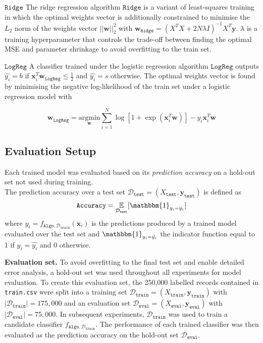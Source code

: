 \documentclass[10pt,conference,compsocconf]{IEEEtran}
\newcommand{\parabf}[1]{\vspace{1mm}\noindent\textbf{#1}}
\newcommand{\Deval}{\mathcal{D}_{\mathtt{eval}}}
\newcommand{\Dtrain}{\mathcal{D}_{\mathtt{train}}}
\newcommand{\Dtest}{\mathcal{D}_{\mathtt{test}}}
\newcommand{\Xtrain}{X_{\mathtt{train}}}
\newcommand{\ytrain}{\mathbf{y}_{\mathtt{train}}}
\newcommand{\Xeval}{X_{\mathtt{eval}}}
\newcommand{\yeval}{\mathbf{y}_{\mathtt{eval}}}
\newcommand{\Xtest}{X_{\mathtt{test}}}
\newcommand{\ytest}{\mathbf{y}_{\mathtt{test}}}
\newcommand{\features}{\mathbf{x}_i}
\newcommand{\target}{y_i}
\newcommand{\targetvector}{\mathbf{y}}
\newcommand{\weights}{\mathbf{w}}
\newcommand{\classifier}[2]{f_{#1, #2}}
\newcommand{\Train}{\mathtt{Algo}}
\newcommand{\Ridge}{\mathtt{Ridge}}
\newcommand{\LogReg}{\mathtt{LogReg}}
\begin{document}
\parabf{$\Ridge$} The ridge regression algorithm $\Ridge$ is a variant of least-squares training in which the optimal weights vector is additionally constrained to minimise the $L_2$ norm of the weights vector $||\weights||_2^2$ with $\weights_\Ridge = (X^T X + 2N\lambda I)^{-1}X^T \targetvector$. $\lambda$ is a training hyperparameter that controls the trade-off between finding the optimal MSE and parameter shrinkage to avoid overfitting to the train set.

\parabf{$\LogReg$} A classifier trained under the logistic regression algorithm $\LogReg$ outputs $\hat{\target} = b$ if $\features^T \weights_{\LogReg} \leq \frac{1}{2}$ and $\hat{\target} = s$ otherwise. The optimal weights vector is found by minimising the negative log-likelihood of the train set under a logistic regression model with

\vspace*{-4mm}
\begin{equation}
	\weights_\LogReg = \underset{\weights}{\text{argmin}} \sum_{i=1}^{N} \log [ 1 + \exp(\features^T\weights) ] - \target\features^T\weights
\end{equation} 


\subsection{Evaluation Setup}
Each trained model was evaluated based on its \emph{prediction accuracy} on a hold-out set not used during training.\\
The prediction accuracy over a test set $\Dtest = (\Xtest, \ytest)$ is defined as
\begin{equation}
	\mathtt{Accuracy} = \underset{\Dtest}{\mathbb{E}}[ \mathbbm{1}_{\target = \hat{\target}} ]
\end{equation}
where $\hat{\target} = \classifier{\Train}{\Dtrain}(\features)$ is the predictions produced by a trained model evaluated over the test set and $\mathbbm{1}_{\target = \hat{\target}}$ the indicator function equal to $1$ if $\target = \hat{\target}$ and $0$ otherwise.

\parabf{Evaluation set.} To avoid overfitting to the final test set and enable detailed error analysis, a hold-out set was used throughout all experiments for model evaluation. To create this evaluation set, the 250,000 labelled records contained in \texttt{train.csv} were split into a training set $\Dtrain = (\Xtrain, \ytrain)$ with $|\Dtrain| = 175,000$ and an evaluation set $\Deval = (\Xeval, \yeval)$ with $|\Deval| = 75,000$. In subsequent experiments, $\Dtrain$ was used to train a candidate classifier $\classifier{\Train}{\Dtrain}$. The performance of each trained classifier was then evaluated as the prediction accuracy on the hold-out set $\Deval$.
\end{document}
